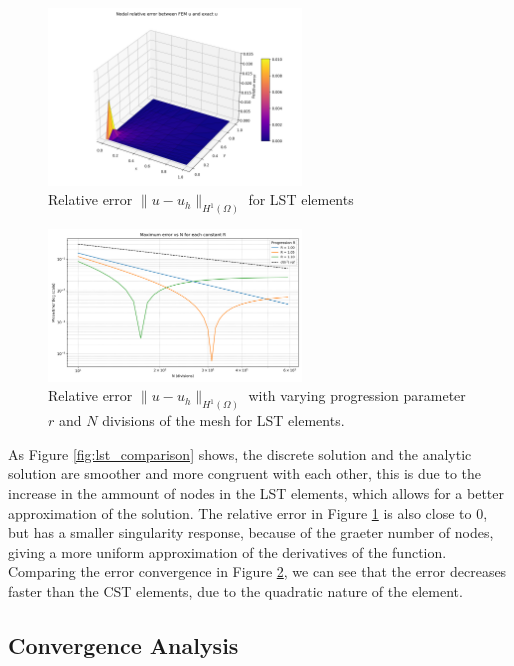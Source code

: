 \begin{figure}[H]
\centering
\includegraphics[width=0.6\textwidth]{GRAFICOS/LST/LST_relative_error_surface_plot.png}
\caption{Relative error \(\|u - u_h\|_{H^1(\Omega)}\) for LST elements}
\label{fig:lst_error_vs_h}
\end{figure}

\begin{figure}[H]
\centering 
\includegraphics[width=0.6\textwidth]{GRAFICOS/LST/errores_por_R.png}
\caption{Relative error \(\|u - u_h\|_{H^1(\Omega)}\) with varying progression parameter $r$ and $N$ divisions of the mesh for LST elements.}
\label{fig:lst_error_vs_h_loglog} 
\end{figure}

As Figure \ref{fig:lst_comparison} shows, the discrete solution and the analytic solution are smoother and more congruent with each other, this is due to the increase in the ammount of nodes in the LST elements, which allows for a better approximation of the solution. The relative error in Figure \ref{fig:lst_error_vs_h} is also close to 0, but has a smaller singularity response, because of the graeter number of nodes, giving a more uniform approximation of the derivatives of the function. Comparing the error convergence in Figure \ref{fig:lst_error_vs_h_loglog}, we can see that the error decreases faster than the CST elements, due to the quadratic nature of the element.

\newpage
\subsection{Convergence Analysis}

